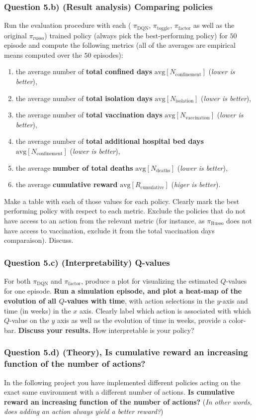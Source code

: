 \documentclass[10pt]{article}
\begin{document}
\subsubsection*{Question 5.b) (Result analysis) Comparing policies}
Run the evaluation procedure with each ( $\pi_\text{DQN}$, $\pi_\text{toggle}$, $\pi_\text{factor}$ as well as the original $\pi_\text{russo}$) trained policy (always pick the best-performing policy) for $50$ episode and compute the following metrics (all of the averages are empirical means computed over the $50$ episodes):
\begin{enumerate}
  \item the average number of \textbf{total confined days} $\text{avg}[N_\text{confinement}]$ (\textit{lower is better}),
  \item the average number of \textbf{total isolation days} $\text{avg}[N_\text{isolation}]$ (\textit{lower is better}),
  \item the average number of \textbf{total vaccination days} $\text{avg}[N_\text{vaccination}]$ (\textit{lower is better}),
  \item the average number of \textbf{total additional hospital bed days} $\text{avg}[N_\text{confinement}]$ (\textit{lower is better}),
  \item the average \textbf{number of total deaths} $\text{avg}[N_\text{deaths}]$ (\textit{lower is better}),
  \item the average \textbf{cumulative reward} $\text{avg}[R_\text{cumulative}]$ (\textit{higer is better}).
\end{enumerate}
\noindent
Make a table with each of those values for each policy. Clearly mark the best performing policy with respect to each metric. Exclude the policies that do not have access to an action from the relevant metric (for instance, as $\pi_\text{Russo}$ does not have access to vaccination, exclude it from the total vaccination days comparaison). Discuss.

\subsubsection*{Question 5.c) (Interpretability) Q-values}
For both $\pi_\text{DQN}$ and $\pi_\text{factor}$, produce a plot for visualizing the estimated $Q$-values for one episode. \textbf{Run a simulation episode, and plot a heat-map of the evolution of all $Q$-values with time}, with action selections in the $y$-axis and time (in weeks) in the $x$ axis. Clearly label which action is associated with which $Q$-value on the $y$ axis as well as the evolution of time in weeks, provide a color-bar. \textbf{Discuss your results.} How interpretable is your policy?

\subsubsection*{Question 5.d) (Theory), Is cumulative reward an increasing function of the number of actions?}
In the following project you have implemented different policies acting on the exact same environment with a different number of actions.
\textbf{Is cumulative reward an increasing function of the number of actions?} (\textit{In other words, does adding an action always yield a better reward?})
\end{document}
